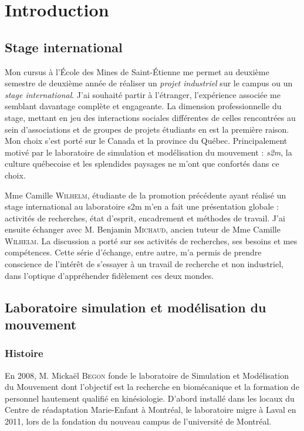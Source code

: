 \part{Introduction}
    \chapter{Stage international}

Mon cursus à l'\'Ecole des Mines de Saint-Étienne me permet au deuxième semestre de deuxième année de réaliser un \emph{projet industriel} sur le campus ou un \emph{stage international}.
J'ai souhaité partir à l'étranger, l'expérience associée me semblant davantage complète et engageante. La dimension professionnelle du stage, mettant en jeu des interactions sociales différentes de celles rencontrées au sein d'associations et de groupes de projets étudiants en est la première raison. Mon choix s'est porté sur le Canada et la province du Québec. Principalement motivé par le laboratoire de simulation et modélisation du mouvement : \emph{s2m}, la culture québecoise et les splendides paysages ne m'ont que confortés dans ce choix.

Mme Camille \textsc{Wilhelm}, étudiante de la promotion précédente ayant réalisé un stage international au laboratoire s2m m'en a fait une présentation globale : activités de recherches, état d'esprit, encadrement et méthodes de travail. J'ai ensuite échanger avec M. Benjamin \textsc{Michaud}, ancien tuteur de Mme  Camille \textsc{Wilhelm}. La discussion a porté sur ses activités de recherches, ses besoins et mes compétences.
Cette série d'échange, entre autre, m'a permis de prendre conscience de l'intérêt de s'essayer à un travail de recherche et non industriel, dans l'optique d'appréhender fidèlement ces deux mondes.


    \chapter[Laboratoire s2m]{Laboratoire simulation et modélisation du mouvement}
        \section{Histoire}
        
En 2008, M. Mickaël \textsc{Begon} fonde le laboratoire de Simulation et Modélisation du Mouvement dont l’objectif est la recherche en biomécanique et la formation de personnel hautement qualifié en kinésiologie. D'abord installé dans les locaux du Centre de réadaptation Marie-Enfant à Montréal, le laboratoire migre à Laval en 2011, lors de la fondation du
nouveau campus de l’université de Montréal.


